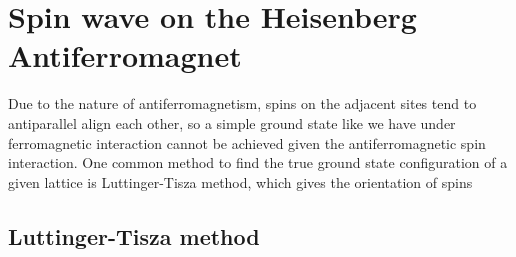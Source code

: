 \documentclass[a4paper,12pt]{article}
\begin{document}
	\section{Spin wave on the Heisenberg Antiferromagnet}
		Due to the nature of antiferromagnetism, spins on the adjacent sites tend to antiparallel align each other, so a simple ground state like we have under ferromagnetic interaction cannot be achieved given the antiferromagnetic spin interaction. One common method to find the true ground state configuration of a given lattice is Luttinger-Tisza method, which gives the orientation of spins 
	\subsection{Luttinger-Tisza method}
\end{document}
